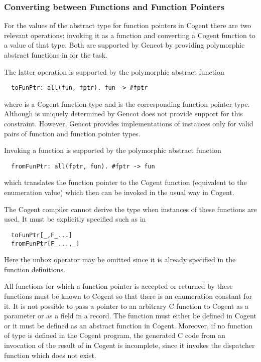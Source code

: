\subsubsection{Converting between Functions and Function Pointers}

For the values of the abstract type for function pointers in Cogent there are two relevant operations: invoking
it as a function and converting a Cogent function to a value of that type. Both are supported by Gencot
by providing polymorphic abstract functions in  for the task.

The latter operation is supported by the polymorphic abstract function
\begin{verbatim}
  toFunPtr: all(fun, fptr). fun -> #fptr
\end{verbatim}
where  is a Cogent function type and  is the corresponding function pointer type.
Although  is uniquely determined by  Gencot does not provide support for this constraint.
However, Gencot provides implementations of instances only for valid pairs of function and function pointer types.

Invoking a function is supported by the polymorphic abstract function
\begin{verbatim}
  fromFunPtr: all(fptr, fun). #fptr -> fun
\end{verbatim}
which translates the function pointer to the Cogent function (equivalent to the enumeration value) which
then can be invoked in the usual way in Cogent. 

The Cogent compiler cannot derive the type  when instances of these functions are used. It
must be explicitly specified such as in 
\begin{verbatim}
  toFunPtr[_,F_...]
  fromFunPtr[F_...,_]
\end{verbatim}
Here the unbox operator \code{\#} may be omitted since it is already specified in the function definitions.

All functions for which a function pointer is accepted or returned by these functions must be known to
Cogent so that there is an enumeration constant for it. It is not possible to pass a pointer to an arbitrary 
C function to Cogent as a parameter or as a field in a record. The function must either be defined in Cogent 
or it must be defined as an abstract function 
in Cogent. Moreover, if no function of type  is defined in the Cogent program, the
generated C code from an invocation of the result of  in Cogent is incomplete, 
since it invokes the dispatcher function which does not exist.

